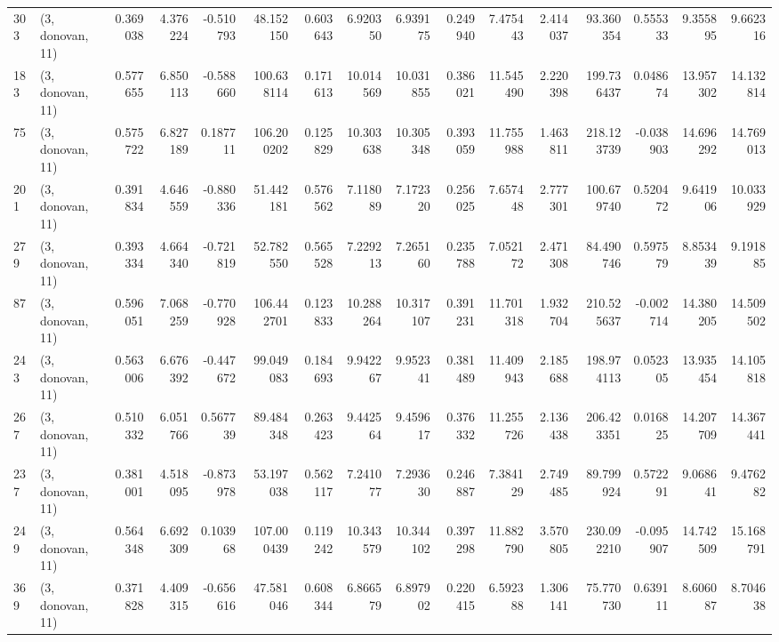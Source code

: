 \begin{tabular}{llrrrrrrrrrrrrrr}
303 &  (3, donovan, 11) &   0.369038 &   4.376224 &  -0.510793 &    48.152150 &   0.603643 &   6.920350 &   6.939175 &  0.249940 &   7.475443 &   2.414037 &    93.360354 &  0.555333 &   9.355895 &   9.662316 \\
183 &  (3, donovan, 11) &   0.577655 &   6.850113 &  -0.588660 &   100.638114 &   0.171613 &  10.014569 &  10.031855 &  0.386021 &  11.545490 &   2.220398 &   199.736437 &  0.048674 &  13.957302 &  14.132814 \\
75  &  (3, donovan, 11) &   0.575722 &   6.827189 &   0.187711 &   106.200202 &   0.125829 &  10.303638 &  10.305348 &  0.393059 &  11.755988 &   1.463811 &   218.123739 & -0.038903 &  14.696292 &  14.769013 \\
201 &  (3, donovan, 11) &   0.391834 &   4.646559 &  -0.880336 &    51.442181 &   0.576562 &   7.118089 &   7.172320 &  0.256025 &   7.657448 &   2.777301 &   100.679740 &  0.520472 &   9.641906 &  10.033929 \\
279 &  (3, donovan, 11) &   0.393334 &   4.664340 &  -0.721819 &    52.782550 &   0.565528 &   7.229213 &   7.265160 &  0.235788 &   7.052172 &   2.471308 &    84.490746 &  0.597579 &   8.853439 &   9.191885 \\
87  &  (3, donovan, 11) &   0.596051 &   7.068259 &  -0.770928 &   106.442701 &   0.123833 &  10.288264 &  10.317107 &  0.391231 &  11.701318 &   1.932704 &   210.525637 & -0.002714 &  14.380205 &  14.509502 \\
243 &  (3, donovan, 11) &   0.563006 &   6.676392 &  -0.447672 &    99.049083 &   0.184693 &   9.942267 &   9.952341 &  0.381489 &  11.409943 &   2.185688 &   198.974113 &  0.052305 &  13.935454 &  14.105818 \\
267 &  (3, donovan, 11) &   0.510332 &   6.051766 &   0.567739 &    89.484348 &   0.263423 &   9.442564 &   9.459617 &  0.376332 &  11.255726 &   2.136438 &   206.423351 &  0.016825 &  14.207709 &  14.367441 \\
237 &  (3, donovan, 11) &   0.381001 &   4.518095 &  -0.873978 &    53.197038 &   0.562117 &   7.241077 &   7.293630 &  0.246887 &   7.384129 &   2.749485 &    89.799924 &  0.572291 &   9.068641 &   9.476282 \\
249 &  (3, donovan, 11) &   0.564348 &   6.692309 &   0.103968 &   107.000439 &   0.119242 &  10.343579 &  10.344102 &  0.397298 &  11.882790 &   3.570805 &   230.092210 & -0.095907 &  14.742509 &  15.168791 \\
369 &  (3, donovan, 11) &   0.371828 &   4.409315 &  -0.656616 &    47.581046 &   0.608344 &   6.866579 &   6.897902 &  0.220415 &   6.592388 &   1.306141 &    75.770730 &  0.639111 &   8.606087 &   8.704638 \\

\end{tabular}
